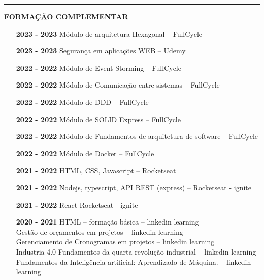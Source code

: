 \documentclass[12pt, a4paper]{article}
\newcommand{\LlinhaG}{2pt} %
\newcommand{\TlinhaG}{17cm}  %
\begin{document}
\begin{center}	%
	\rule{\TlinhaG}{\LlinhaG}
\end{center}

\begin{center}
	\textbf{FORMAÇÃO COMPLEMENTAR}\\
\end{center}
\begin{itemize}
	\item[\textbf{2023 - 2023}] Módulo de arquitetura Hexagonal – FullCycle\\
	\item[\textbf{2023 - 2023}] Segurança em aplicações WEB – Udemy\\
	\item[\textbf{2022 - 2022}] Módulo de Event Storming – FullCycle\\
	\item[\textbf{2022 - 2022}] Módulo de Comunicação entre sistemas – FullCycle\\
	\item[\textbf{2022 - 2022}] Módulo de DDD – FullCycle\\
	\item[\textbf{2022 - 2022}] Módulo de SOLID Express – FullCycle\\
	\item[\textbf{2022 - 2022}] Módulo de Fundamentos de arquitetura de software – FullCycle\\
	\item[\textbf{2022 - 2022}] Módulo de Docker – FullCycle\\
	\item[\textbf{2021 - 2022}] HTML, CSS, Javascript – Rocketseat\\
	\item[\textbf{2021 - 2022}] Nodejs, typescript, API REST (express) – Rocketseat - ignite\\
	\item[\textbf{2021 - 2022}] React Rocketseat - ignite\\
	\item[\textbf{2020 - 2021}] HTML – formação básica – linkedin learning\\
		Gestão de orçamentos em projetos – linkedin learning\\
		Gerenciamento de Cronogramas em projetos – linkedin learning\\
		Industria 4.0 Fundamentos da quarta revolução industrial – linkedin learning\\
		Fundamentos da Inteligência artificial: Aprendizado de Máquina. – linkedin learning\\

\end{itemize}
\end{document}
